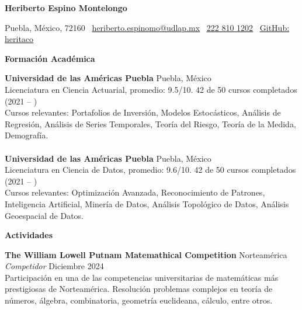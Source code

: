 \documentclass[8pt]{extarticle} %
\begin{document}
{\fontsize{10pt}{12pt}\selectfont  
\begin{center}  
    \textbf{Heriberto Espino Montelongo}\\  
    \vspace{-1ex} %
\end{center}  
}

\begin{center}  
    Puebla, México, 72160 \textbullet \   
    \href{mailto:heriberto.espinomo@udlap.mx}{\textcolor{customblue}{\underline{heriberto.espinomo@udlap.mx}}} \textbullet \   
    \href{tel:+522228101202}{\textcolor{customblue}{\underline{222 810 1202}}} \textbullet \   
    \href{https://github.com/heritaco}{\textcolor{customblue}{\underline{GitHub: heritaco}}}  
\end{center}

\begin{center}  
    \vspace{5ex}  
    \textbf{Formación Académica}  
    \vspace{-2ex}  
\end{center}

\textbf{Universidad de las Américas Puebla} \hfill Puebla, México\\  
Licenciatura en Ciencia Actuarial, promedio: 9.5/10. \hfill 42 de 50 cursos completados (2021 -- ) \\  
Cursos relevantes: Portafolios de Inversión, Modelos Estocásticos, Análisis de Regresión, Análisis de Series Temporales, Teoría del Riesgo, Teoría de la Medida, Demografía.\\  
\\  
\textbf{Universidad de las Américas Puebla} \hfill Puebla, México\\  
Licenciatura en Ciencia de Datos, promedio: 9.6/10. \hfill 42 de 50 cursos completados (2021 -- )\\  
Cursos relevantes: Optimización Avanzada, Reconocimiento de Patrones, Inteligencia Artificial, Minería de Datos, Análisis Topológico de Datos, Análisis Geoespacial de Datos.

\begin{center}  
    \vspace{1ex}  
    \textbf{Actividades}  
    \vspace{-1ex}  
\end{center}

\textbf{The William Lowell Putnam Matemathical Competition} \hfill Norteamérica\\  
\textit{Competidor} \hfill Diciembre 2024\\  
Participación en una de las competencias universitarias de matemáticas más prestigiosas de Norteamérica. Resolución problemas complejos en teoría de números, álgebra, combinatoria, geometría euclideana, cálculo, entre otros.\\
\end{document}
